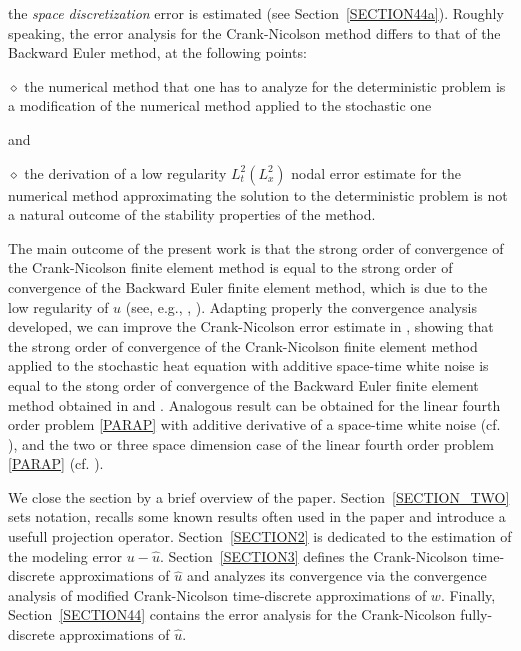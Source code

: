 \documentclass[10pt]{amsart}
\numberwithin{equation}{section}
\begin{document}
the {\sl space discretization} error is estimated (see Section~\ref{SECTION44a}).
Roughly speaking, the error analysis for the Crank-Nicolson method
differs to that of the Backward Euler method, at the following points:
\par
$\diamond$ the numerical method that one has to analyze for the deterministic problem is 
a modification of the numerical method applied to the stochastic one
\par
and
\par
$\diamond$ the derivation of a low regularity  $L^2_t(L^2_x)$ nodal error estimate 
for the numerical method approximating the solution to the deterministic problem
is not a natural outcome of the stability properties of the method.
\par
The main outcome of the present work is that the strong order of convergence
of the Crank-Nicolson finite element method is equal to
the strong order of convergence of the Backward Euler finite element method,
which is due to the low regularity of $u$
(see, e.g., \cite{KZ2010}, \cite{LMes2011}).
Adapting properly the convergence analysis developed, we can improve the Crank-Nicolson
error estimate in \cite{Walsh05}, showing that the strong order of convergence of the
Crank-Nicolson finite element method applied to the stochastic heat equation with additive space-time white
noise is equal to the stong order of convergence of the Backward Euler finite
element method obtained in \cite{Walsh05} and \cite{YubinY05}.
Analogous result can be obtained for the linear fourth order problem \eqref{PARAP}
with additive derivative of a space-time white noise (cf. \cite{KZ2013b}), and
the two or three space dimension case of the
linear fourth order problem \eqref{PARAP} (cf. \cite{KZ2013a}).
\par
We close the section by a brief overview of the paper.
Section~\ref{SECTION_TWO} sets notation, recalls some
known results o\-ften used in the paper and introduce a usefull
projection operator.
Section~\ref{SECTION2} is dedicated to the estimation of the modeling error
$u-{\widehat u}$.
Section~\ref{SECTION3} defines the Crank-Nicolson time-discrete
approximations of ${\widehat u}$ and analyzes its convergence 
via the convergence analysis of modified Crank-Nicolson time-discrete
approximations of $w$.
Finally, Section~\ref{SECTION44} contains the error analysis for the
Crank-Nicolson fully-discrete approximations of ${\widehat u}$.
\end{document}
